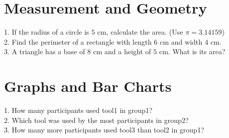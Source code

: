 \documentclass{article}
\begin{document}
\section{Measurement and Geometry}
1. If the radius of a circle is $5$ cm, calculate the area. (Use $\pi = 3.14159$) \\
2. Find the perimeter of a rectangle with length $6$ cm and width $4$ cm. \\
3. A triangle has a base of $8$ cm and a height of $5$ cm. What is its area? \\

\section{Graphs and Bar Charts}

1. How many participants used tool1 in group1? \\
2. Which tool was used by the most participants in group2? \\
3. How many more participants used tool3 than tool2 in group1? \\
\end{document}
